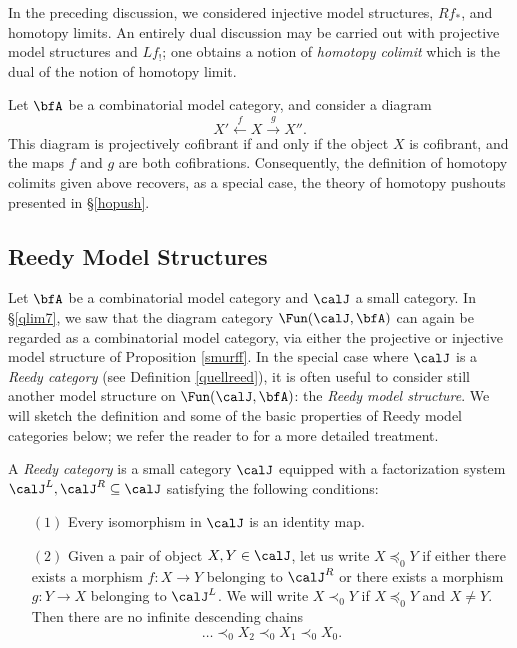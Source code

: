 \begin{Model Categories}
\begin{Didn't Read}
\begin{remark}
In the preceding discussion, we considered injective model structures,
$Rf_{\ast}$, and homotopy limits. An entirely dual discussion may
be carried out with projective model structures and $Lf_{!}$; one obtains a
notion of {\it homotopy colimit} which is the dual of the notion
of homotopy limit.
\end{remark}

\begin{example}
Let $\bfA$ be a combinatorial model category, and consider a diagram
$$ X' \stackrel{f}{\leftarrow} X \stackrel{g}{\rightarrow} X''.$$
This diagram is projectively cofibrant if and only if the object $X$ is cofibrant, and the maps
$f$ and $g$ are both cofibrations. Consequently, the definition of homotopy colimits given above recovers, as a special case, the theory of homotopy pushouts presented in \S \ref{hopush}.
\end{example}

\subsection{Reedy Model Structures}\label{coreed}

Let $\bfA$ be a combinatorial model category and $\calJ$ a small category. In
\S \ref{qlim7}, we saw that the diagram category $\Fun( \calJ, \bfA)$ can again be regarded as a combinatorial model category, via either the projective or injective model structure of
Proposition \ref{smurff}. In the special case where $\calJ$ is a {\em Reedy category}
(see Definition \ref{quellreed}), it is often useful to consider still another model structure on $\Fun(\calJ, \bfA)$: the {\it Reedy model structure}. We will sketch the definition and some of the basic properties of Reedy model categories below; we refer the reader to \cite{hirschhorn} for a more detailed treatment.

\begin{definition}\label{quellreed}
A {\it Reedy category} is a small category $\calJ$ equipped with a factorization
system $\calJ^{L}, \calJ^{R} \subseteq \calJ$ satisfying the following conditions:
\begin{itemize}
\item[$(1)$] Every isomorphism in $\calJ$ is an identity map.
\item[$(2)$] Given a pair of object $X, Y \in \calJ$, let us write
$X \preceq_0 Y$ if either there exists a morphism $f: X \rightarrow Y$ belonging
to $\calJ^{R}$ or there exists a morphism $g: Y \rightarrow X$ belonging to $\calJ^{L}$.
We will write $X \prec_0 Y$ if $X \preceq_0 Y$ and $X \neq Y$.
Then there are no infinite descending chains $$ \ldots \prec_0 X_2 \prec_0 X_1 \prec_0 X_0.$$
\end{itemize}
\end{definition}


\end{Didn't Read}
\end{Model Categories}
